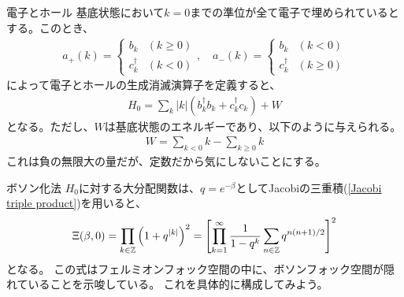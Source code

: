 \documentclass[\main/TL_liquid.tex]{subfiles}
\begin{document}
\begin{frame}{電子とホール}
    基底状態において$k=0$までの準位が全て電子で埋められているとする。このとき、
    \begin{align}
        a_+(k) = \begin{cases}
            b_k & (k \ge 0) \\
            c_k^\dagger & (k < 0)
        \end{cases},
        \quad
        a_-(k) = \begin{cases}
            b_k & (k < 0) \\
            c_k^\dagger & (k \ge 0)
        \end{cases}
    \end{align}
    によって電子とホールの生成消滅演算子を定義すると、
    \begin{align}
        H_0 = \sum_k |k|(b_k^\dagger b_k + c_k^\dagger c_k) + W
    \end{align}
    となる。ただし、$W$は基底状態のエネルギーであり、以下のように与えられる。
    \begin{align}
        W = \sum_{k<0} k - \sum_{k \ge 0} k
    \end{align}
    これは負の無限大の量だが、定数だから気にしないことにする。
\end{frame}


\begin{frame}{ボソン化法}
    $H_0$に対する大分配関数は、$q = e^{-\beta}$としてJacobiの三重積(\ref{Jacobi triple product})を用いると、
    \begin{align}
        \Xi(\beta,0) = \prod_{k \in \mathbb{Z}}\qty(1+q^{|k|})^2 = \qty[\prod_{k=1}^\infty \frac{1}{1-q^k} \sum_{n \in \mathbb{Z}}q^{n(n+1)/2}]^2
    \end{align}
    となる。
    この式はフェルミオンフォック空間の中に、ボソンフォック空間が隠れていることを示唆している。
    これを具体的に構成してみよう。
\end{frame}
\end{document}
